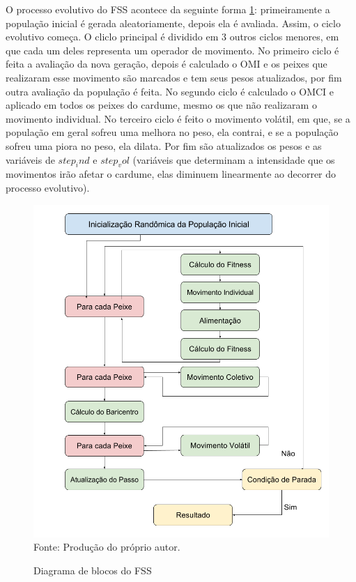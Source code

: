 O processo evolutivo do FSS acontece da seguinte forma \ref{fig:pseudo_code}: primeiramente a população inicial é gerada aleatoriamente, depois ela é avaliada. Assim, o ciclo evolutivo começa. O cliclo principal é dividido em 3 outros ciclos menores, em que cada um deles representa um operador de movimento. No primeiro ciclo é feita a avaliação da nova geração, depois é calculado o OMI e os peixes que realizaram esse movimento são marcados e tem seus pesos atualizados, por fim outra avaliação da população é feita. No segundo ciclo é calculado o OMCI e aplicado em todos os peixes do cardume, mesmo os que não realizaram o movimento individual. No terceiro ciclo é feito o movimento volátil, em que, se a população em geral sofreu uma melhora no peso, ela contrai, e se a população sofreu uma piora no peso, ela dilata. Por fim são atualizados os pesos e as variáveis de $step_ind$ e $step_vol$ (variáveis que determinam a intensidade que os movimentos irão afetar o cardume, elas diminuem linearmente ao decorrer do processo evolutivo).

\begin{figure}[!htb]
	\caption{Diagrama de blocos do FSS}
	\centering
	\includegraphics[scale=0.5]{images/pseudo_codigo.png}
	\label{fig:pseudo_code}{\\Fonte: Produção do próprio autor.}
\end{figure}

